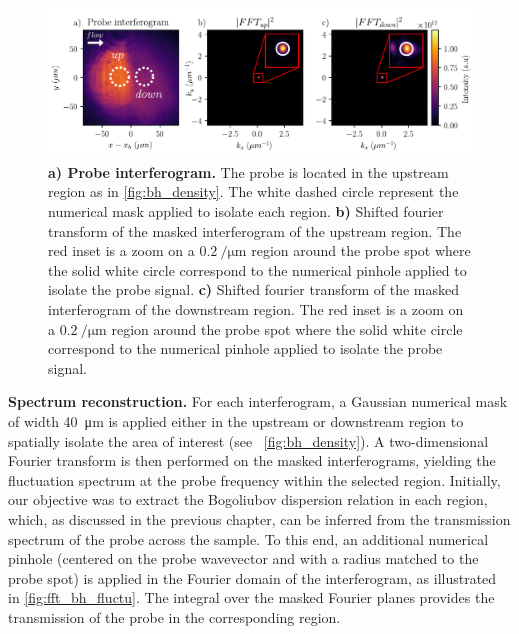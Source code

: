 \begin{figure}
    \centering
    \includegraphics[width=1\textwidth]{chap_stimulated_hawking/fig/fft_bh_fluctu.pdf}
    \caption{\textbf{a) Probe interferogram.} The probe is located in the upstream region as in \autoref{fig:bh_density}. The white dashed circle represent the numerical mask applied to isolate each region.
    \textbf{b)} Shifted fourier transform of the masked interferogram of the upstream region. The red inset is a zoom on a $\SI{0.2}{\per \micro \meter}$ region around the probe spot where the solid white circle correspond to the numerical pinhole applied to isolate the probe signal.
    \textbf{c)} Shifted fourier transform of the masked interferogram of the downstream region. The red inset is a zoom on a $\SI{0.2}{\per \micro \meter}$ region around the probe spot where the solid white circle correspond to the numerical pinhole applied to isolate the probe signal.}
    \label{fig:fft_bh_fluctu}
\end{figure}

\textbf{Spectrum reconstruction.} For each interferogram, a Gaussian numerical mask of width \SI{40}{\micro \meter} is applied either in the upstream or downstream region to spatially isolate the area of interest (see ~\ref{fig:bh_density}). A two-dimensional Fourier transform is then performed on the masked interferograms, yielding the fluctuation spectrum at the probe frequency within the selected region.
Initially, our objective was to extract the Bogoliubov dispersion relation in each region, which, as discussed in the previous chapter, can be inferred from the transmission spectrum of the probe across the sample. To this end, an additional numerical pinhole (centered on the probe wavevector and with a radius matched to the probe spot) is applied in the Fourier domain of the interferogram, as illustrated in \autoref{fig:fft_bh_fluctu}.
The integral over the masked Fourier planes provides the transmission of the probe in the corresponding region.


